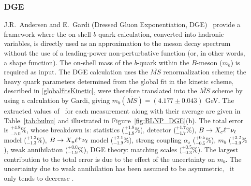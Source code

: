 \subsubsection{DGE}
J.R.~Andersen and E.~Gardi (Dressed Gluon Exponentiation, DGE)~\cite{ref:DGE} provide
a framework where the on-shell $b$-quark calculation, converted into hadronic variables, is
directly used as an approximation to the meson decay spectrum without
the use of a leading-power non-perturbative function (or, in other words,
a shape function). The on-shell mass of the $b$-quark within the $B$-meson ($m_b$) is
required as input. 
The DGE calculation uses the $\overline{MS}$ renormalization scheme; the heavy quark parameters determined  
from the global fit in the kinetic scheme, described in \ref{globalfitsKinetic}, were therefore 
translated into the $\overline{MS}$ scheme by using a calculation by Gardi, giving 
$m_b({\overline{MS}})=(4.177 \pm 0.043)$ GeV.
The extracted values
of \vub\, for each measurement along with their average are given in
Table~\ref{tab:bulnu} and illustrated in Figure~\ref{fig:BLNP_DGE}(b).
The total error is $^{+4.8}_{-5.0}\%$, whose breakdown is:
statistics ($^{+1.8}_{-1.8}\%$),
detector ($^{+1.7}_{-1.7}\%$),
$B\to X_c \ell^+ \nu_\ell$ model ($^{+1.3}_{-1.3}\%$),
$B\to X_u \ell^+ \nu_\ell$ model ($^{+2.1}_{-1.9}\%$),
strong coupling $\alpha_s$ ($^{+0.5}_{-0.5}\%$),
$m_b$ ($^{+3.2}_{-3.0}\%$),
weak annihilation ($^{+0.0}_{-1.9}\%$),
DGE theory: matching scales ($^{+0.5}_{-0.3}\%$).
The largest contribution to the total error is due to the effect of the uncertainty 
on $m_b$. 
The uncertainty due to 
weak annihilation has been assumed to be asymmetric, \ie\ it only tends to decrease \vub.


